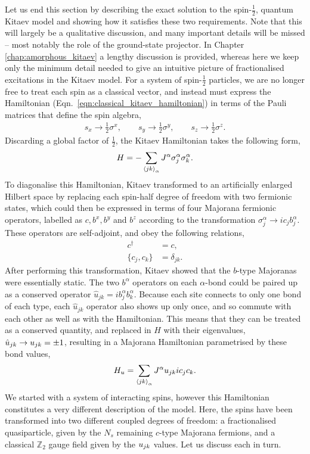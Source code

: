 Let us end this section by describing the exact solution to the spin-$\frac 12$, quantum Kitaev model and showing how it satisfies these two requirements. Note that this will largely be a qualitative discussion, and many important details will be missed -- most notably the role of the ground-state projector. In Chapter \ref{chap:amorphous_kitaev} a lengthy discussion is provided, whereas here we keep only the minimum detail needed to give an intuitive picture of fractionalised excitations in the Kitaev model. For a system of spin-$\frac 12$ particles, we are no longer free to treat each spin as a classical vector, and instead must express the Hamiltonian (Eqn.~\ref{eqn:classical_kitaev_hamiltonian}) in terms of the Pauli matrices that define the spin algebra,
\begin{align}
    s_x \rightarrow \frac 12\sigma^x ,\qquad
    s_y \rightarrow \frac 12\sigma^y ,\qquad
    s_z \rightarrow \frac 12\sigma^z .
\end{align}
Discarding a global factor of $\frac 12$, the Kitaev Hamiltonian takes the following form, 
\begin{align}
    H = - \sum_{\braket{jk}_\alpha} J^\alpha \sigma^\alpha_j \sigma^\alpha_k.
\end{align}
To diagonalise this Hamiltonian, Kitaev transformed to an artificially enlarged Hilbert space by replacing each spin-half degree of freedom with two fermionic states, which could then be expressed in terms of four Majorana fermionic operators, labelled as $c, b^x, b^y$ and $b^z$ according to the transformation $\sigma^\alpha_j \rightarrow i c_j b^\alpha_j$. These operators are self-adjoint, and obey the following relations,
\begin{align}
    \label{eqn:maj_1}
    c^\dag &= c,\\ 
    \label{eqn:maj_2}
    \{c_j, c_k\} &= \delta_{jk}.
\end{align}
After performing this transformation, Kitaev showed that the $b$-type Majoranas were essentially static. The two $b^\alpha$ operators on each $\alpha$-bond could be paired up as a conserved operator $\hat u_{jk} = ib^\alpha_j b^\alpha_k$. Because each site connects to only one bond of each type, each $\hat u_{jk}$ operator also shows up only once, and so commute with each other as well as with the Hamiltonian. This means that they can be treated as a conserved quantity, and replaced in $H$ with their eigenvalues, $\hat u_{jk} \rightarrow u_{jk} = \pm 1$, resulting in a Majorana Hamiltonian parametrised by these bond values,
\begin{align} \label{eqn:kit_as_gauge_field}
    H_u = \sum_{\braket{jk}_\alpha} J^\alpha u_{jk} i c_j c_k.
\end{align}
We started with a system of interacting spins, however this Hamiltonian constitutes a very different description of the model. Here, the spins have been transformed into two different coupled degrees of freedom: a fractionalised quasiparticle, given by the $N_s$ remaining $c$-type Majorana fermions, and a classical $\mathbb Z_2$ gauge field given by the $u_{jk}$ values. Let us discuss each in turn.

